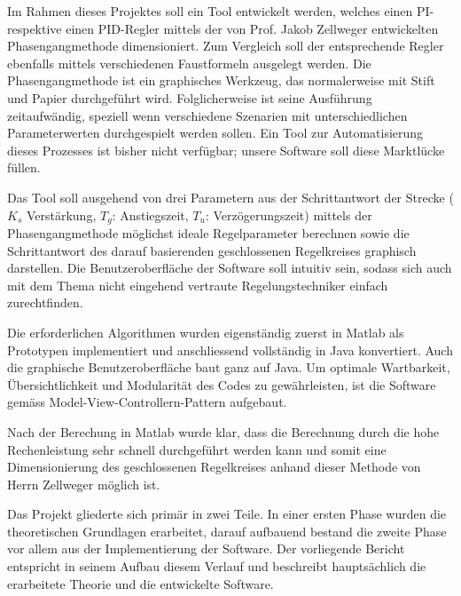 Im Rahmen dieses Projektes soll ein  Tool entwickelt werden, welches einen PI-  %
respektive einen PID-Regler mittels der von Prof. Jakob Zellweger entwickelten
Phasengangmethode                                                               %
dimensioniert. Zum Vergleich  soll der entsprechende Regler  ebenfalls mittels
verschiedenen  Faustformeln ausgelegt  werden. Die  Phasengangmethode ist  ein
graphisches Werkzeug,  das normalerweise  mit Stift und  Papier durchgef\"uhrt
wird. Folglicherweise  ist seine  Ausf\"uhrung zeitaufw\"andig,  speziell wenn
verschiedene  Szenarien  mit unterschiedlichen  Parameterwerten  durchgespielt
werden sollen. Ein Tool zur Automatisierung  dieses Prozesses ist bisher nicht
verf\"ugbar; unsere Software soll diese Marktl\"ucke f\"ullen.

Das Tool soll ausgehend von drei Parametern aus der Schrittantwort der Strecke  %
($K_s$ Verst\"arkung, $T_g$: Anstiegszeit, $T_u$: Verz\"ogerungszeit)           %
mittels  der  Phasengangmethode  m\"oglichst ideale  Regelparameter  berechnen
sowie  die Schrittantwort  des darauf  basierenden geschlossenen  Regelkreises
graphisch  darstellen. Die  Benutzeroberfl\"ache  der Software  soll  intuitiv
sein,   sodass   sich  auch   mit   dem   Thema  nicht   eingehend   vertraute
Regelungstechniker einfach zurechtfinden.

Die  erforderlichen   Algorithmen  wurden  eigenst\"andig  zuerst   in  Matlab %
als  Prototypen   implementiert  und   anschliessend  vollst\"andig   in  Java
konvertiert. Auch die  graphische Benutzeroberfl\"ache baut ganz  auf Java. Um
optimale  Wartbarkeit,  \"Ubersichtlichkeit  und Modularit\"at  des  Codes  zu
gew\"ahrleisten,  ist  die  Software  gem\"ass  Model-View-Controllern-Pattern
aufgebaut.

Nach  der Berechung  in  Matlab  wurde klar,  dass  die  Berechnung durch  die %
hohe Rechenleistung  sehr schnell  durchgef\"uhrt werden  kann und  somit eine
Dimensionierung des geschlossenen Regelkreises anhand dieser Methode von Herrn
Zellweger m\"oglich ist.

Das  Projekt gliederte  sich prim\"ar  in  zwei Teile. In  einer ersten  Phase %
wurden  die  theoretischen  Grundlagen erarbeitet,  darauf  aufbauend  bestand
die  zweite  Phase  vor  allem   aus  der  Implementierung  der  Software. Der
vorliegende Bericht entspricht in seinem  Aufbau diesem Verlauf und beschreibt
haupts\"achlich die erarbeitete Theorie und die entwickelte Software.
